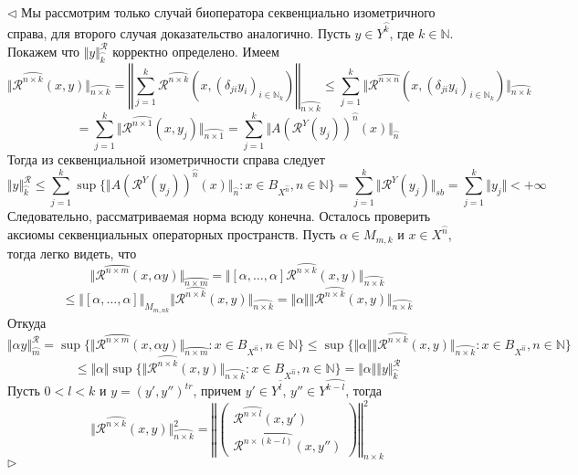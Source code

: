 \documentclass[12pt]{article}
\newenvironment{proof}{\par $\triangleleft$}{$\triangleright$}
\begin{document}
\begin{proof}
Мы рассмотрим только случай биоператора секвенциально изометричного справа, для второго случая доказательство аналогично. Пусть $y\in Y^{\wideparen{k}}$, где $k\in\mathbb{N}$. Покажем что $\Vert y\Vert_{\wideparen{k}}^{\mathcal{R}}$ 
корректно определено. Имеем
$$
\Vert\mathcal{R}^{\wideparen{n\times k}}(x,y)\Vert_{\wideparen{n\times k}}
=\left\Vert\sum\limits_{j=1}^k\mathcal{R}^{\wideparen{n\times k}}(x,(\delta_{ji}y_i)_{i\in\mathbb{N}_k})\right\Vert_{\wideparen{n\times k}}
\leq\sum\limits_{j=1}^k\Vert\mathcal{R}^{\wideparen{n\times n}}(x,(\delta_{ji}y_i)_{i\in\mathbb{N}_k})\Vert_{\wideparen{n\times k}}
$$
$$
=\sum\limits_{j=1}^k\Vert\mathcal{R}^{\wideparen{n\times 1}}(x,y_j)\Vert_{\wideparen{n\times 1}}
=\sum\limits_{j=1}^k\Vert A(\mathcal{R}^Y(y_j))^{\wideparen{n}}(x)\Vert_{\wideparen{n}}
$$
Тогда из секвенциальной изометричности справа следует
$$
\Vert y\Vert_{\wideparen{k}}^{\mathcal{R}}
\leq\sum\limits_{j=1}^k\sup\{\Vert A(\mathcal{R}^Y(y_j))^{\wideparen{n}}(x)\Vert_{\wideparen{n}}:x\in B_{X^{\wideparen{n}}}, n\in\mathbb{N}\}
=\sum\limits_{j=1}^k \Vert\mathcal{R}^Y(y_j)\Vert_{sb}
=\sum\limits_{j=1}^k \Vert y_j\Vert<+\infty
$$
Следовательно, рассматриваемая норма всюду конечна. Осталось проверить аксиомы секвенциальных операторных пространств. Пусть $\alpha\in M_{m,k}$ и $x\in X^{\wideparen{n}}$, тогда легко видеть, что
$$
\Vert\mathcal{R}^{\wideparen{n\times m}}(x,\alpha y)\Vert_{\wideparen{n\times m}}
=\Vert[\alpha,\ldots,\alpha]\mathcal{R}^{\wideparen{n\times k}}(x,y)\Vert_{\wideparen{n\times k}}
$$
$$
\leq\Vert[\alpha,\ldots,\alpha]\Vert_{M_{m,nk}}\Vert\mathcal{R}^{\wideparen{n\times k}}(x,y)\Vert_{\wideparen{n\times k}}
=\Vert\alpha\Vert\Vert\mathcal{R}^{\wideparen{n\times k}}(x,y)\Vert_{\wideparen{n\times k}}
$$
Откуда
$$
\Vert\alpha y\Vert_{\wideparen{m}}^{\mathcal{R}}
=\sup\{\Vert\mathcal{R}^{\wideparen{n\times m}}(x,\alpha y)\Vert_{\wideparen{n\times m}}:x\in B_{X^{\wideparen{n}}},n\in\mathbb{N}\}
\leq\sup\{\Vert\alpha\Vert\Vert\mathcal{R}^{\wideparen{n\times k}}(x,y)\Vert_{\wideparen{n\times k}}:x\in B_{X^{\wideparen{n}}},n\in\mathbb{N}\}
$$
$$
\leq\Vert\alpha\Vert\sup\{\Vert\mathcal{R}^{\wideparen{n\times k}}(x,y)\Vert_{\wideparen{n\times k}}:x\in B_{X^{\wideparen{n}}},n\in\mathbb{N}\}
=\Vert\alpha\Vert\Vert y\Vert_{\wideparen{k}}^{\mathcal{R}}
$$
Пусть $0<l<k$ и $y=(y', y'')^{tr}$, причем $y'\in Y^{\wideparen{l}}$, $y''\in Y^{\wideparen{k-l}}$, тогда
$$
\Vert \mathcal{R}^{\wideparen{n\times k}}(x,y)\Vert_{\wideparen{n\times k}}^2
=\left\Vert\begin{pmatrix}\mathcal{R}^{\wideparen{n\times l}}(x,y')\\ \mathcal{R}^{\wideparen{n\times (k-l)}}(x,y'')\end{pmatrix}\right\Vert_{n\times k}^2
$$
\end{proof}
\end{document}
